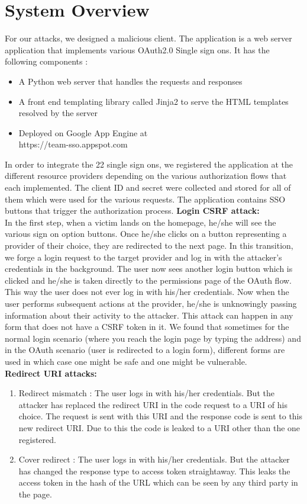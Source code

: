 \section{System Overview}
\label{sec:design}
For our attacks, we designed a malicious client.  The application is a web server application that implements various OAuth2.0 Single sign ons. It has the following components :
\begin{itemize}
\item A Python web server that handles the requests and responses
\item A front end templating library called Jinja2 to serve the HTML templates resolved by the server
\item Deployed on Google App Engine at \\
https://team-sso.appspot.com
\end{itemize}
In order to integrate the 22 single sign ons, we registered the application at the different resource providers depending on the various authorization flows that each implemented. The client ID and secret were collected and stored for all of them which were used for the various requests. The application contains SSO buttons that trigger the authorization process. 
\textbf{Login CSRF attack:}\\
In the first step, when a victim lands on the homepage, he/she will see the various sign on option buttons. Once he/she clicks on a button representing a provider of their choice, they are redirected to the next page. In this transition, we forge a login request to the target provider and log in with the attacker's credentials in the background. The user now sees another login button which is clicked and he/she is taken directly to the permissions page of the OAuth flow. This way the user does not ever log in with his/her credentials. Now when the user performs subsequent actions at the provider, he/she is unknowingly passing information about their activity to the attacker. This attack can happen in any form that does not have a CSRF token in it. We found that sometimes for the normal login scenario (where you reach the login page by typing the address) and in the OAuth scenario (user is redirected to a login form), different forms are used in which case one might be safe and one might be vulnerable. \\
\textbf{Redirect URI attacks:}
\begin{enumerate}[label=(\Alph*)]
\item Redirect mismatch : The user logs in with his/her credentials. But the attacker has replaced the redirect URI in the code request to a URI of his choice. The request is sent with this URI and the response code is sent to this new redirect URI. Due to this the code is leaked to a URI other than the one registered. 
\item Cover redirect : The user logs in with his/her credentials. But the attacker has changed the response type to access token straightaway. This leaks the access token in the hash of the URL which can be seen by any third party in the page. 
\end{enumerate}